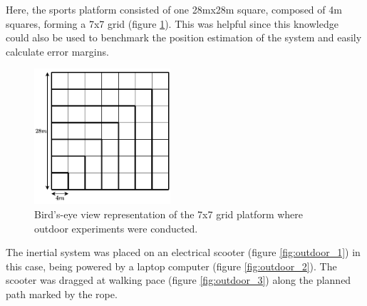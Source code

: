 Here, the sports platform consisted of one 28mx28m square, composed of 4m squares, forming a 7x7 grid (figure \ref{fig:platform_representation}). This was helpful since this knowledge could also be used to benchmark the position estimation of the system and easily calculate error margins.

\begin{figure}[!h]
    \centering
    \includegraphics[width=0.45\textwidth]{figures/square.pdf}
    \caption{ Bird's-eye view representation of the 7x7 grid platform where outdoor experiments were conducted. }
    \label{fig:platform_representation}
\end{figure}





The inertial system was placed on an electrical scooter (figure \ref{fig:outdoor_1}) in this case, being powered by a laptop computer (figure \ref{fig:outdoor_2}). The scooter was dragged at walking pace (figure \ref{fig:outdoor_3}) along the planned path marked by the rope.


